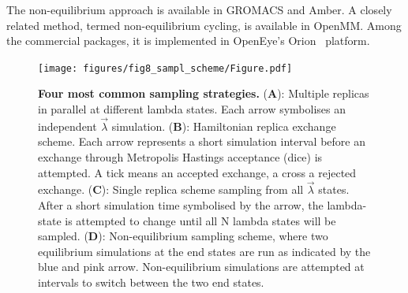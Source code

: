 \documentclass[9pt,bestpractices]{livecoms}
\begin{document}
The non-equilibrium approach is available in GROMACS and Amber. A closely related method, termed non-equilibrium cycling, is available in OpenMM. Among the commercial packages, it is implemented in OpenEye's Orion{\textregistered}~\cite{sorensen2024orion} platform.

\begin{figure}
    \texttt{[image: figures/fig8\_sampl\_scheme/Figure.pdf]}
    \caption{\textbf{Four most common sampling strategies.} (\textbf{A}): Multiple replicas in parallel at different lambda states. Each arrow symbolises an independent $\vec{\lambda}$ simulation. (\textbf{B}): Hamiltonian replica exchange scheme. Each arrow represents a short simulation interval before an exchange through Metropolis Hastings acceptance (dice) is attempted. A tick means an accepted exchange, a cross a rejected exchange. (\textbf{C}): Single replica scheme sampling from all $\vec{\lambda}$ states. After a short simulation time symbolised by the arrow, the lambda-state is attempted to change until all N lambda states will be sampled. (\textbf{D}): Non-equilibrium sampling scheme, where two equilibrium simulations at the end states are run as indicated by the blue and pink arrow. Non-equilibrium simulations are attempted at intervals to switch between the two end states.}
    \label{fig:fig_sampling_scheme}
\end{figure} 

\end{document}

